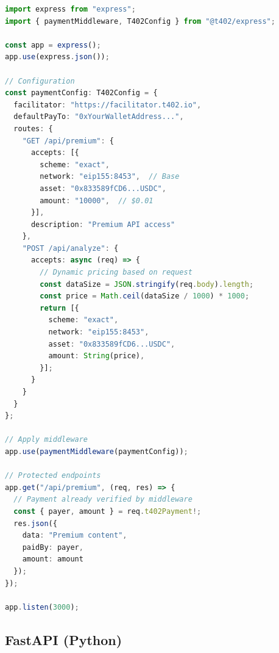 \begin{lstlisting}[language=typescript,caption={Complete Express.js server setup}]
import express from "express";
import { paymentMiddleware, T402Config } from "@t402/express";

const app = express();
app.use(express.json());

// Configuration
const paymentConfig: T402Config = {
  facilitator: "https://facilitator.t402.io",
  defaultPayTo: "0xYourWalletAddress...",
  routes: {
    "GET /api/premium": {
      accepts: [{
        scheme: "exact",
        network: "eip155:8453",  // Base
        asset: "0x833589fCD6...USDC",
        amount: "10000",  // $0.01
      }],
      description: "Premium API access"
    },
    "POST /api/analyze": {
      accepts: async (req) => {
        // Dynamic pricing based on request
        const dataSize = JSON.stringify(req.body).length;
        const price = Math.ceil(dataSize / 1000) * 1000;
        return [{
          scheme: "exact",
          network: "eip155:8453",
          asset: "0x833589fCD6...USDC",
          amount: String(price),
        }];
      }
    }
  }
};

// Apply middleware
app.use(paymentMiddleware(paymentConfig));

// Protected endpoints
app.get("/api/premium", (req, res) => {
  // Payment already verified by middleware
  const { payer, amount } = req.t402Payment!;
  res.json({
    data: "Premium content",
    paidBy: payer,
    amount: amount
  });
});

app.listen(3000);
\end{lstlisting}

\subsection{FastAPI (Python)}

